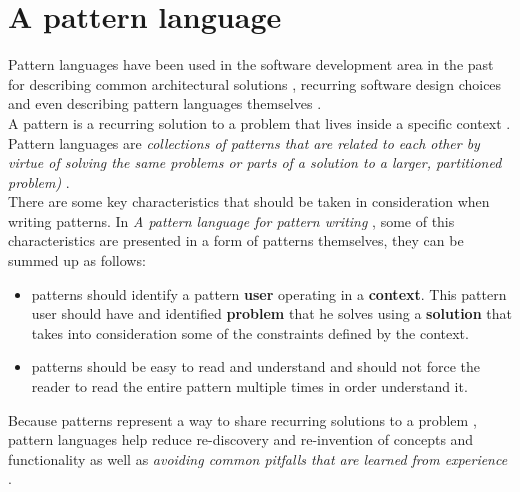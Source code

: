    \section{A pattern language} \label{sec:stateoftheart:sec:patterns}
    Pattern languages have been used in the software development area in the past for describing common architectural solutions \cite{kircher2013pattern}, recurring software design choices \cite{johnson1995design} and even describing pattern languages themselves \cite{Meszaros1998}.\\
    A pattern is a recurring solution to a problem that lives inside a specific context \cite{Meszaros1998}. Pattern languages are \textit{collections of patterns that are related to each other by virtue of solving the same problems or parts of a solution to a larger, partitioned problem)} \cite{Meszaros1998}.\\
    There are some key characteristics that should be taken in consideration when writing patterns. In \textit{A pattern language for pattern writing} \cite{Meszaros1998}, some of this characteristics are presented in a form of patterns themselves, they can be summed up as follows:
    \begin{itemize}
      \item patterns should identify a pattern \textbf{user} operating in a \textbf{context}. This pattern user should have and identified \textbf{problem} that he solves using a \textbf{solution} that takes into consideration some of the constraints defined by the context.
      \item patterns should be easy to read and understand and should not force the reader to read the entire pattern multiple times in order understand it.
    \end{itemize}
    Because patterns represent a way to share recurring solutions to a problem \cite{Meszaros1998}, pattern languages help reduce re-discovery and re-invention of concepts and functionality as well as \textit{avoiding common pitfalls that are learned from experience} \cite{Schmidt1995}.
